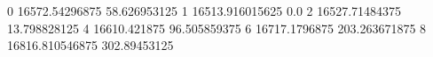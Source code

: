 0 16572.54296875 58.626953125
1 16513.916015625 0.0
2 16527.71484375 13.798828125
4 16610.421875 96.505859375
6 16717.1796875 203.263671875
8 16816.810546875 302.89453125
